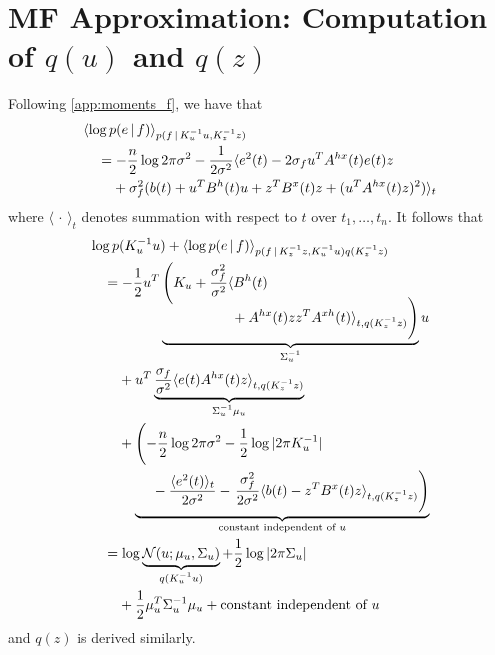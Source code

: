 \documentclass{article}
\newcommand{\cond}{\, | \,}               %
\renewcommand{\ll}{\left}
\newcommand{\rr}{\right}
\newcommand{\la}{\langle}
\newcommand{\ra}{\rangle}
\newcommand{\phan}[1]{\hphantom{#1\;}}
\begin{document}
\section{MF Approximation: Computation of $q(u)$ and $q(z)$}
\label{app:computation_quqz}
Following \cref{app:moments_f}, we have that
\begin{align*}
    &\la \log p(e\cond f) \ra_{p(f\cond K_u^{-1} u, K_z^{-1} z)} \\
    &\quad= -\frac{n}{2}\log 2 \pi \sigma^2 - \frac{1}{2 \sigma^2} \la e^{2}(t) - 2 \sigma_f u^T A^{hx}(t) e(t) z\\
    &\quad\phan{=}  + \sigma_f^2 ( b(t) + u^T B^{h}(t) u+ z^T B^{x}(t) z + (u^T A^{hx}(t) z)^2 ) \ra_t
\end{align*}
where $\la\,\cdot\,\ra_t$ denotes summation with respect to $t$ over $t_1,\ldots,t_n$.
It follows that
\begin{align*}
    &\log p(K_u^{-1} u)  + \la \log p(e\cond f) \ra_{p(f\cond K_z^{-1}z, K_u^{-1}u)q(K_z^{-1}z)} \\
    &\quad= -\frac{1}{2}u^T\ll(K_u + \frac{\sigma_f^2}{\sigma^2} \la B^{h}(t) \rr.\\[-3\jot]
    &\quad\phan{= -\frac{1}{2}u^T}
        \underbrace{
            \phan{\ll(K_u + \frac{\sigma_f^2}{\sigma^2} \la \rr. } \!\!\!\!\!
            \ll. \vphantom{\frac{\sigma_f^2}{\sigma^2} }
                 + A^{hx}(t)  z z^T A^{xh}(t) \ra_{t,q(K_z^{-1} z)}
            \rr)
        }_{\Sigma_u^{-1}}u \\
    &\quad\phan{=}+ u^T \underbrace{\frac{\sigma_f}{\sigma^2}\la e(t) A^{hx}(t) z\ra_{t,q(K_z^{-1}z)}}_{\Sigma_u^{-1} \mu_u} \\
    &\quad\phan{=}  + \ll(\vphantom{\frac{\sigma_f^2}{2 \sigma^2}} {-\frac{n}{2}}\log 2 \pi \sigma^2-\frac{1}{2}\log|2 \pi K_u^{-1}|  \rr. \\
    &\quad\phan{=+}\underbrace{\phan{ \ll(\vphantom{\frac{\sigma_f^2}{2 \sigma^2}}\rr.}- \frac{\la e^2(t)\ra_t}{2 \sigma^2} - \ll.\frac{\sigma_f^2}{2 \sigma^2}\la b(t) - z^T B^{x}(t) z\ra_{t,q(K_z^{-1}z)}\rr)}_{\text{constant independent of $u$}} \\
    &\quad= \log \underbrace{\mathcal{N}(u; \mu_u, \Sigma_u)}_{q(K_u^{-1}u)}+ \frac{1}{2}\log|2 \pi \Sigma_u| \\
    &\quad\phan{=}+ \frac{1}{2}\mu_u^T \Sigma_u^{-1}\mu_u  + \text{constant independent of $u$}
\end{align*}
and $q(z)$ is derived similarly.
\end{document}
